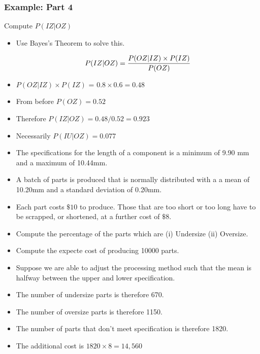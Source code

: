 \begin{frame}
\frametitle{Example: Part 4}
Compute $P(IZ|OZ)$ 
\begin{itemize}
\item Use Bayes's Theorem to solve this.

\[P(IZ|OZ) = {P(OZ|IZ)\times P(IZ)\over P(OZ)} \]

\item $P(OZ|IZ)\times P(IZ)$ = $0.8 \times 0.6 = 0.48$

\item From before $P(OZ) = 0.52$

\item Therefore $P(IZ|OZ) = 0.48 / 0.52 = \boldsymbol{0.923}$

\item Necessarily $P(IU|OZ)  = 0.077$
\end{itemize}
\end{frame}
\begin{frame}
\begin{itemize}
\item The specifications for the length of a component is a minimum of 9.90 mm  and a maximum of 10.44mm.

\item A batch of parts is produced that is normally distributed with a a mean of 10.20mm and a standard deviation of 0.20mm.

\item Each part costs $\$10$ to produce. Those that are too short or too long have to be scrapped, or shortened, at a further cost of $\$8$.

\item Compute the percentage of the parts which are (i) Undersize (ii) Oversize.

\item Compute the expecte cost of producing 10000 parts.

\item Suppose we are able to adjust the processing method such that the mean is halfway between the upper and lower specification.
\end{itemize}
\end{frame}


\begin{frame}
\begin{itemize}
\item The number of undersize parts is therefore 670.
\item The number of oversize parts is therefore 1150.
\item The number of parts that don't meet specification is therefore 1820.
\item The additional cost is $1820 \times 8 = 14,560$
\end{itemize}
\end{frame}


